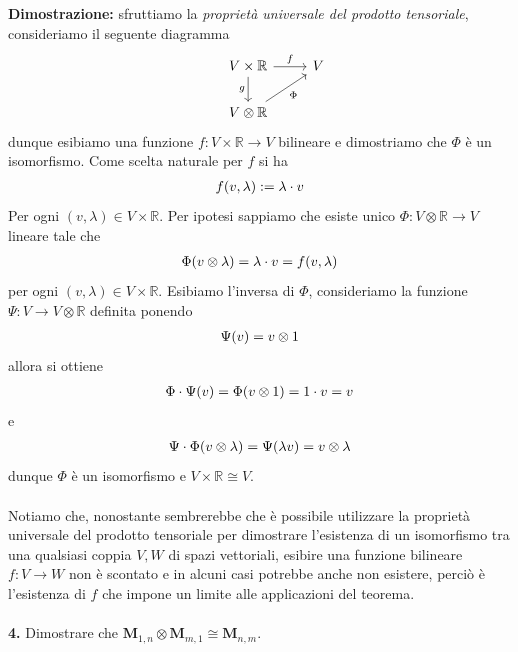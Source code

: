 \documentclass{article}
\begin{document}
\textbf{Dimostrazione:} sfruttiamo la \textit{proprietà universale del prodotto tensoriale}, consideriamo il seguente diagramma \\
\[
\begin{tikzcd}
&V \times \mathbb{R} \arrow[r,"f"] \arrow[d,"g", swap] & V \\
&V \otimes \mathbb{R} \arrow[ur, "\Phi", swap] 
\end{tikzcd}
\]
dunque esibiamo una funzione $f : V \times \mathbb{R} \longrightarrow V$ bilineare e dimostriamo che $\Phi$ è un isomorfismo. Come scelta naturale per $f$ si ha
\begin{gather}
    f(v, \lambda) := \lambda \cdot v \notag
\end{gather}
Per ogni $(v, \lambda) \in V \times \mathbb{R}$. Per ipotesi sappiamo che esiste unico $\Phi : V \otimes \mathbb{R} \longrightarrow V$ lineare tale che
\begin{gather}
    \Phi(v \otimes \lambda) = \lambda \cdot v = f(v, \lambda) \notag
\end{gather}
per ogni $(v, \lambda) \in V \times \mathbb{R}$. Esibiamo l'inversa di $\Phi$, consideriamo la funzione $\Psi : V \longrightarrow V \otimes \mathbb{R}$ definita ponendo
\begin{gather}
    \Psi (v) = v \otimes 1 \notag
\end{gather}
allora si ottiene
\begin{gather}
    \Phi \cdot \Psi (v) = \Phi(v \otimes 1) = 1 \cdot v = v \notag
\end{gather}
e
\begin{gather}
    \Psi \cdot \Phi (v \otimes \lambda) = \Psi (\lambda v) = v \otimes \lambda \notag
\end{gather}
dunque $\Phi$ è un isomorfismo e $V \times \mathbb{R} \cong V$. \\ \\
Notiamo che, nonostante sembrerebbe che è possibile utilizzare la proprietà universale del prodotto tensoriale per dimostrare l'esistenza di un isomorfismo tra una qualsiasi coppia $V, W$ di spazi vettoriali, esibire una funzione bilineare $f : V \longrightarrow W$ non è scontato e in alcuni casi potrebbe anche non esistere, perciò è l'esistenza di $f$ che impone un limite alle applicazioni del teorema. \\ \\
\textbf{4.} Dimostrare che $\mathbf{M}_{1, n} \otimes \mathbf{M}_{m, 1} \cong \mathbf{M}_{n, m}$. \\
\end{document}

